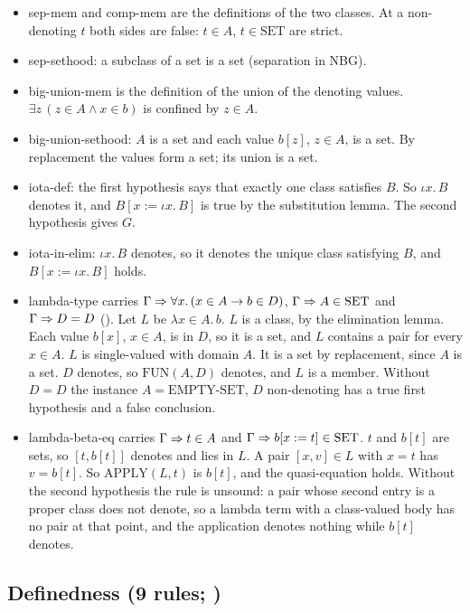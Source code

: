 \begin{itemize}
\item sep-mem and comp-mem are the definitions of the two classes.  At a
  non-denoting $t$ both sides are false: $t\in A$, $t\in\mathrm{SET}$
  are strict.
\item sep-sethood: a subclass of a set is a set (separation in NBG).
\item big-union-mem is the definition of the union of the denoting values.
  $\exists z\,(z\in A\wedge x\in b)$ is confined by $z\in A$.
\item big-union-sethood: $A$ is a set and each value $b[z]$, $z\in A$, is
  a set.  By replacement the values form a set; its union is a set.
\item iota-def: the first hypothesis says that exactly one class
  satisfies $B$.  So $\iota x.\,B$ denotes it, and $B[x:=\iota x.\,B]$ is
  true by the substitution lemma.  The second hypothesis gives $G$.
\item iota-in-elim: $\iota x.\,B$ denotes, so it denotes the unique
  class satisfying $B$, and $B[x:=\iota x.\,B]$ holds.
\item lambda-type carries $\Gamma\Rightarrow\forall x.\,(x\in A\to b\in D)$,
  $\Gamma\Rightarrow A\in\mathrm{SET}$ and $\Gamma\Rightarrow D=D$ ().  Let $L$ be
  $\lambda x{\in}A.\,b$.  $L$ is a class, by the elimination lemma.  Each
  value $b[x]$, $x\in A$, is in $D$, so it is a set, and $L$ contains a
  pair for every $x\in A$.  $L$ is single-valued with domain $A$.  It is a
  set by replacement, since $A$ is a set.  $D$ denotes, so
  $\mathrm{FUN}(A,D)$ denotes, and $L$ is a member.  Without $D=D$ the
  instance $A=\mathrm{EMPTY\text{-}SET}$, $D$ non-denoting has a true
  first hypothesis and a false conclusion.
\item lambda-beta-eq carries $\Gamma\Rightarrow t\in A$ and
  $\Gamma\Rightarrow b[x:=t]\in\mathrm{SET}$.  $t$ and $b[t]$ are sets, so
  $[t, b[t]]$ denotes and lies in $L$.  A pair $[x, v]\in L$ with $x=t$
  has $v=b[t]$.  So $\mathrm{APPLY}(L,t)$ is $b[t]$, and the
  quasi-equation holds.  Without the second hypothesis the rule is
  unsound: a pair whose second entry is a proper class does not denote,
  so a lambda term with a class-valued body has no pair at that point,
  and the application denotes nothing while $b[t]$ denotes.
\end{itemize}

\subsection{Definedness (9 rules; )}

